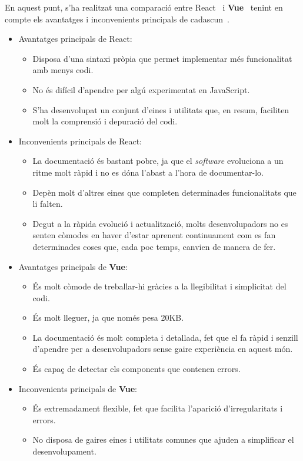 \documentclass[a4paper,12pt]{ThesisStyle}
\begin{document}
En aquest punt, s'ha realitzat una comparació entre React~\cite{React} i \textbf{Vue}~\cite{Vue} tenint en compte els avantatges i inconvenients principals de cadascun~\cite{ReactVsVue}.
\begin{itemize}
  \item Avantatges principals de React:
  \begin{itemize}
    \item Disposa d'una sintaxi pròpia que permet implementar més funcionalitat amb menys codi.
    \item No és difícil d'apendre per algú experimentat en JavaScript.
    \item S'ha desenvolupat un conjunt d'eines i utilitats que, en resum, faciliten molt la comprensió i depuració del codi.
  \end{itemize}
  \item Inconvenients principals de React:
  \begin{itemize}
    \item La documentació és bastant pobre, ja que el \textit{software} evoluciona a un ritme molt ràpid i no es dóna l'abast a l'hora de documentar-lo.
    \item Depèn molt d'altres eines que completen determinades funcionalitats que li falten.
    \item Degut a la ràpida evolució i actualització, molts desenvolupadors no es senten còmodes en haver d'estar aprenent continuament com es fan determinades coses que, cada poc temps, canvien de manera de fer.
  \end{itemize}
  \item Avantatges principals de \textbf{Vue}:
  \begin{itemize}
    \item És molt còmode de treballar-hi gràcies a la llegibilitat i simplicitat del codi.
    \item És molt lleguer, ja que només pesa 20KB.
    \item La documentació és molt completa i detallada, fet que el fa ràpid i senzill d'apendre per a desenvolupadors sense gaire experiència en aquest món.
    \item És capaç de detectar els components que contenen errors.
  \end{itemize}
  \item Inconvenients principals de \textbf{Vue}:
  \begin{itemize}
    \item És extremadament flexible, fet que facilita l'aparició d'irregularitats i errors.
    \item No disposa de gaires eines i utilitats comunes que ajuden a simplificar el desenvolupament.
  \end{itemize}
\end{itemize}
\end{document}

